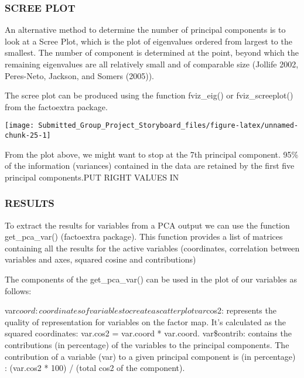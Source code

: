 \documentclass[]{article}
\begin{document}
\subsubsection{SCREE PLOT}\label{scree-plot}

An alternative method to determine the number of principal components is
to look at a Scree Plot, which is the plot of eigenvalues ordered from
largest to the smallest. The number of component is determined at the
point, beyond which the remaining eigenvalues are all relatively small
and of comparable size (Jollife 2002, Peres-Neto, Jackson, and Somers
(2005)).

The scree plot can be produced using the function fviz\_eig() or
fviz\_screeplot() from the factoextra package.

\begin{center}\texttt{[image: Submitted\_Group\_Project\_Storyboard\_files/figure-latex/unnamed-chunk-25-1]} \end{center}

From the plot above, we might want to stop at the 7th principal
component. 95\% of the information (variances) contained in the data are
retained by the first five principal components.PUT RIGHT VALUES IN

\subsubsection{RESULTS}\label{results}

To extract the results for variables from a PCA output we can use the
function get\_pca\_var() (factoextra package). This function provides a
list of matrices containing all the results for the active variables
(coordinates, correlation between variables and axes, squared cosine and
contributions)

The components of the get\_pca\_var() can be used in the plot of our
variables as follows:

var\(coord: coordinates of variables to create a scatter plot var\)cos2:
represents the quality of representation for variables on the factor
map. It's calculated as the squared coordinates: var.cos2 = var.coord *
var.coord. var\$contrib: contains the contributions (in percentage) of
the variables to the principal components. The contribution of a
variable (var) to a given principal component is (in percentage) :
(var.cos2 * 100) / (total cos2 of the component).
\end{document}
